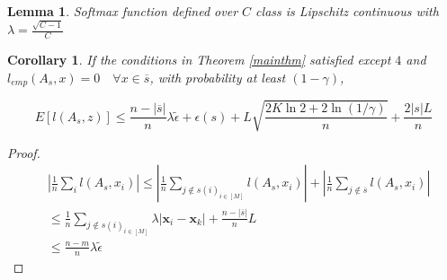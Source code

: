 \documentclass{article}
\newtheorem{lemma}{Lemma}
\newtheorem{cor}{Corollary}
\begin{document}
\begin{lemma}
Softmax function defined over $C$ class is  Lipschitz continuous with $\lambda=\frac{\sqrt{C-1}}{C}$
\end{lemma}


\begin{cor}
If the conditions in Theorem \ref{mainthm} satisfied except $4$ and $l_{emp}(A_s,x)=0\quad \forall x \in \overline{s}$, with probability at least $(1-\gamma)$,
\begin{small}
\[
E[l(A_s,z)] \leq \frac{n-|\overline{s}|}{n} \lambda \tilde{\epsilon} + \epsilon(s) + L \sqrt{\frac{2K\ln 2 + 2\ln (1/\gamma)}{n}} + \frac{2|s|L}{n}  
\]
\end{small}
\end{cor}
\begin{proof}
\[
\begin{aligned}
&\left|\frac{1}{n}\sum_i l(A_s,x_i) \right| \leq \left|\frac{1}{n}\sum_{j \notin {s(i)}_{i\in [M]}} l(A_s,x_i)  \right| +  \left|\frac{1}{n}\sum_{j \notin\overline{s}} l(A_s,x_i)  \right| \\
&\leq  \frac{1}{n}\sum_{j \notin {s(i)}_{i\in [M]}} \lambda  \left| \mathbf{x}_i - \mathbf{x}_k\right | +\frac{n-|\overline{s}|}{n}L \\
&\leq \frac{n-m}{n} \lambda \tilde{\epsilon}
\end{aligned}
\]
\end{proof}
\end{document}
